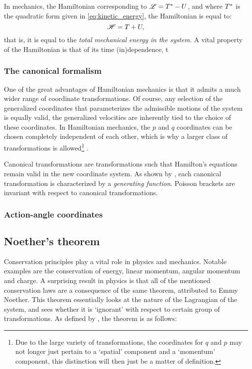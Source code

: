In mechanics, the Hamiltonian corresponding to $\mathscr{L} = T^* - U$, and where $T^*$ is the quadratic form given in \cref{eq:kinetic_energy}, the Hamiltonian is equal to:
\begin{equation}
    \mathscr{H} = T + U,
\end{equation}
that is, it is equal to the \emph{total mechanical energy in the system}. A vital property of the Hamiltonian is that of its time (in)dependence, t

\subsubsection{The canonical formalism}
One of the great advantages of Hamiltonian mechanics is that it admits a much wider range of coordinate transformations. Of course, any selection of the generalized coordinates that parameterizes the admissible motions of the system is equally valid, the generalized velocities are inherently tied to the choice of these coordinates. In Hamiltonian mechanics, the \(p\) and \(q\) coordinates can be chosen completely independent of each other, which is why a larger class of transformations is allowed\footnote{Due to the large variety of transformations, the coordinates for \(q\) and \(p\) may not longer just pertain to a `spatial' component and a `momentum' component, this distinction will then just be a matter of definition.} \cite{Landau1960}.

Canonical transformations are transformations such that Hamilton's equations remain valid in the new coordinate system. As shown by \citet{Landau1960}, each canonical transformation is characterized by a \emph{generating function}. Poisson brackets are invariant with respect to canonical transformations.

\subsubsection{Action-angle coordinates}

\subsection{Noether's theorem}
Conservation principles play a vital role in physics and mechanics. Notable examples are the conservation of energy, linear momentum, angular momentum and charge. A surprising result in physics is that all of the mentioned conservation laws are a consequence of the same theorem, attributed to Emmy Noether. This theorem essentially looks at the nature of the Lagrangian of the system, and sees whether it is `ignorant' with respect to certain group of transformations. As defined by \citet{Arnold1989}, the theorem is as follows:

